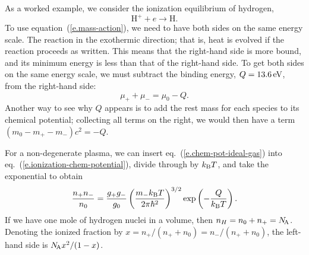 As a worked example, we consider the ionization equilibrium of hydrogen,
\[ \mathrm{H^{+}} + e \to \mathrm{H}. \]
To use equation~(\ref{e.mass-action}), we need to have both sides on the same energy scale. The reaction in the exothermic direction; that is, heat is evolved if the reaction proceeds as written.  This means that the right-hand side is more bound, and its minimum energy is less than that of the right-hand side. To get both sides on the same energy scale, we must subtract the binding energy, $Q=13.6\,\mathrm{eV}$, from the right-hand side:
\begin{equation}\label{e.ionization-chem-potential}
\mu_{+} + \mu_{-}= \mu_{0} -  Q.
\end{equation}
Another way to see why $Q$ appears is to add the rest mass for each species to its chemical potential; collecting all terms on the right, we would then have a term $(m_{0}-m_{+}-m_{-})c^{2} = -Q$.

For a non-degenerate plasma, we can insert eq.~(\ref{e.chem-pot-ideal-gas}) into eq.~(\ref{e.ionization-chem-potential}), divide through by $k_\mathrm{B} T$, and take the exponential to obtain
\begin{equation}\label{e.saha-eqn}
\frac{n_{+}n_{-}}{n_{0}} = \frac{g_{+}g_{-}}{g_{0}}\left(\frac{m_{-}k_\mathrm{B} T}{2\pi\hbar^{2}}\right)^{3/2}\exp\left(-\frac{Q}{k_\mathrm{B} T}\right).
\end{equation}
If we have one mole of hydrogen nuclei in a volume, then $n_{H} = n_{0}+n_{+} = N_\mathrm{\!A}$.  Denoting the ionized fraction by $x = n_{+}/(n_{+}+n_{0}) = n_{-}/(n_{+}+n_{0})$, the left-hand side is $N_\mathrm{\!A} x^{2}/(1-x)$.


